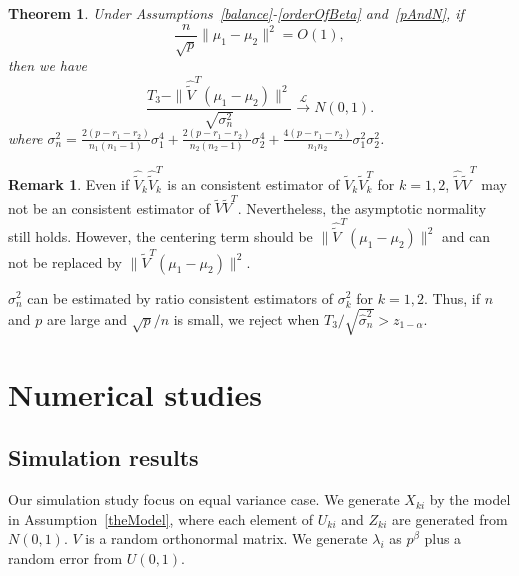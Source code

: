 \documentclass[review]{elsarticle}
\theoremstyle{plain}
\newtheorem{theorem}{\quad\quad Theorem}
\theoremstyle{definition}
\newtheorem{remark}{\quad\quad Remark}
\theoremstyle{remark}
\begin{document}
\begin{theorem}\label{myXiaopanpan}
    Under Assumptions~\ref{balance}-\ref{orderOfBeta} and~\ref{pAndN},
     if 
    $$\frac{n}{\sqrt{p}}\|\mu_1-\mu_2\|^2=O(1),$$
     then we have
\begin{equation*}
    \frac{T_3-\|\hat{\tilde{V}}^T(\mu_1-\mu_2)\|^2}{\sqrt{\sigma_n^2}}\xrightarrow{\mathcal{L}} N(0,1).
\end{equation*}
where
$\sigma_n^2=\frac{2(p-r_1-r_2)}{n_1(n_1-1)}\sigma_1^4+\frac{2(p-r_1-r_2)}{n_2(n_2-1)}\sigma_2^4+\frac{4(p-r_1-r_2)}{n_1n_2}\sigma_1^2\sigma_2^2$.
\end{theorem}
\begin{remark}
    Even if $\hat{\tilde{V}}_k\hat{\tilde{V}}_k^T$ is an consistent estimator of $\tilde{V}_k\tilde{V}_k^T$ for $k=1,2$, $\hat{\tilde{V}}\hat{\tilde{V}}^T$ may not be an consistent estimator of $\tilde{V}\tilde{V}^T$.
    Nevertheless, the asymptotic normality still holds.
    However, the centering term should be $\|\hat{\tilde{V}}^T(\mu_1-\mu_2)\|^2$ and can not be replaced by $\|\tilde{V}^T(\mu_1-\mu_2)\|^2$.
\end{remark}

 $\sigma_n^2$ can be estimated by ratio consistent estimators of $\sigma^2_k$ for $k=1,2$. Thus, if $n$ and $p$ are large and ${\sqrt{p}}/{n}$ is small, we reject when $T_3/\sqrt{\hat{\sigma}_n^2}>z_{1-\alpha}$. 




\section{Numerical studies}
\subsection{Simulation results}

Our simulation study focus on equal variance case. 
We generate $X_{ki}$ by the model in Assumption~\ref{theModel}, where each element of $U_{ki}$ and $Z_{ki}$ are generated from $N(0,1)$.
$V$ is a random orthonormal matrix. 
We generate $\lambda_i$ as $p^{\beta}$ plus a random error from $U(0,1)$.
\end{document}
